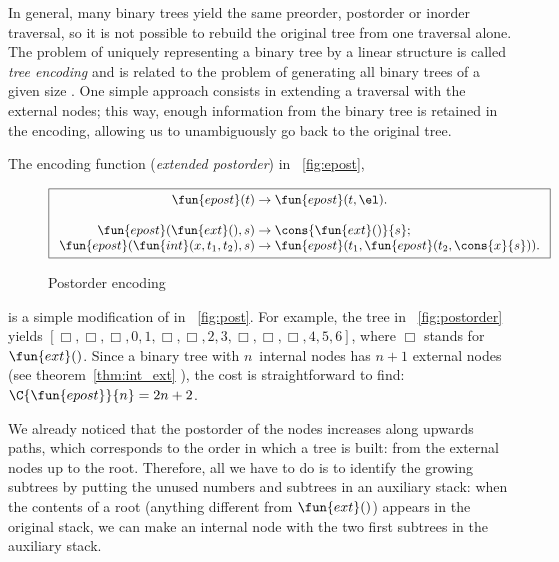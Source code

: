In general, many binary trees yield the same preorder, postorder or
inorder traversal, so it is not possible to rebuild the original tree
from one traversal alone. The problem of uniquely representing a
binary tree by a linear structure is called \emph{tree
  encoding} \citep{Makinen_1991} and is related to the problem of
generating all binary trees of a given
size \citep[7.2.1.6]{Knuth_2011}. One simple approach consists in
extending a traversal with the external nodes; this way, enough
information from the binary tree is retained in the encoding, allowing
us to unambiguously go back to the original tree.

The encoding function
(\emph{extended postorder}) in
\fig~\vref{fig:epost},
\begin{figure}
\begin{equation*}
\boxed{
\begin{array}{r@{\;}c@{\;}l}
\fun{epost}(t) & \rightarrow & \fun{epost}(t,\el).\\
\\
\fun{epost}(\fun{ext}(),s) & \rightarrow
  & \cons{\fun{ext}()}{s};\\
\fun{epost}(\fun{int}(x,t_1,t_2),s) & \rightarrow
  & \fun{epost}(t_1,\fun{epost}(t_2,\cons{x}{s})).
\end{array}}
\end{equation*}
\caption{Postorder encoding}
\label{fig:epost}
\end{figure}
is a simple modification of  in
\fig~\vref{fig:post}. For example, the tree in
\fig~\vref{fig:postorder} yields \([\Box, \Box, \Box, 0, 1, \Box,
\Box, 2, 3, \Box, \Box, \Box, 4, 5, 6]\), where \(\Box\) stands for
\(\fun{ext}()\). Since a binary tree with \(n\)~internal nodes has
\(n+1\) external nodes (see theorem~\ref{thm:int_ext}
), the cost is straightforward to find:
\(\C{\fun{epost}}{n} = 2n + 2\).

We already noticed that the postorder of the nodes increases along
upwards paths, which corresponds to the order in which a tree is
built: from the external nodes up to the root. Therefore, all we have
to do is to identify the growing subtrees by putting the unused
numbers and subtrees in an auxiliary stack: when the contents of a
root (anything different from \(\fun{ext}()\)) appears in the original
stack, we can make an internal node with the two first subtrees in the
auxiliary stack.

